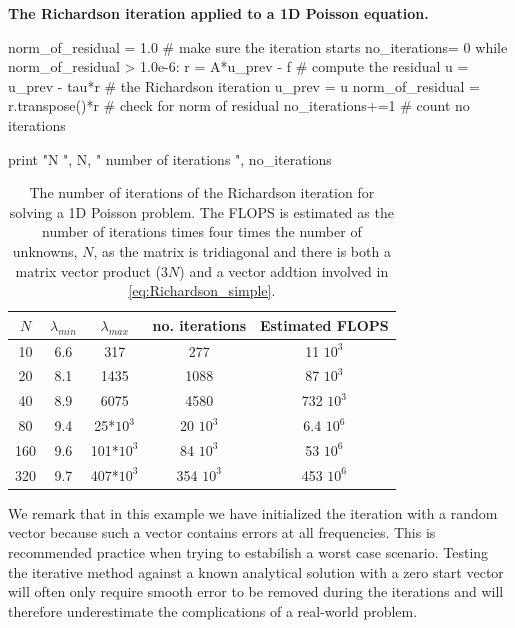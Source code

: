 \begin{example}{\textbf{The Richardson iteration applied to a  1D Poisson equation.}}
\begin{python}
  norm_of_residual = 1.0                      # make sure the iteration starts
  no_iterations= 0                        
  while norm_of_residual > 1.0e-6: 
    r = A*u_prev - f                          # compute the residual 
    u = u_prev - tau*r                        # the Richardson iteration 
    u_prev = u                                 
    norm_of_residual = r.transpose()*r        # check for norm of residual 
    no_iterations+=1                          # count no iterations  

  print "N ", N, " number of iterations ", no_iterations
 
\end{python}

\begin{table}[h]
\begin{center}
\begin{tabular}{|c|c|c|c|c|}  \hline
$N $ & $\lambda_{min}$ & $\lambda_{max}$& no. iterations & Estimated FLOPS \\ \hline
10 & 6.6  & 317   & 277 &  11 $10^3$      \\ \hline
20  & 8.1 & 1435  & 1088 & 87 $10^3$     \\ \hline
40  & 8.9 & 6075  &  4580 & 732  $10^3$   \\ \hline
80 & 9.4  & 25*$10^3$ & 20 $10^3$ & 6.4 $10^6$ \\ \hline 
160 & 9.6 & 101*$10^3$ & 84 $10^3$ & 53 $10^6$   \\ \hline  
320 & 9.7 & 407*$10^3$ & 354 $10^3$ & 453 $10^6$ \\ \hline 
\end{tabular}
\caption{The number of iterations of the Richardson iteration for 
solving a 1D Poisson problem. The FLOPS is estimated 
as the number of iterations times four times the number of unknowns, $N$, 
as the matrix is tridiagonal and there is both a matrix vector product (3$N$)
and a vector addtion involved in \eqref{eq:Richardson_simple}. }
\label{norms}
\end{center}
\end{table}
We remark that in this example we have initialized the iteration with a random vector because
such a vector contains errors at all frequencies. This is recommended practice when 
trying to estabilish a worst case scenario. Testing the iterative method against a known analytical solution with 
a zero start vector will often only require smooth error to be removed during the iterations and will
therefore underestimate the complications of a real-world problem.   
\end{example}



